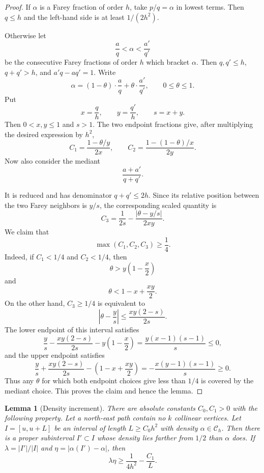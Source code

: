 \documentclass[11pt]{article}
\newtheorem{lemma}[theorem]{Lemma}
\theoremstyle{definition}
\theoremstyle{remark}
\newcommand{\1}{\mathbf 1}
\begin{document}
\begin{proof}
If $\alpha$ is a Farey fraction of order $h$, take $p/q=\alpha$ in lowest terms. Then $q\le h$ and the left-hand side is at least $1/(2h^2)$.

\bigskip
\noindent
Otherwise let
\[
\frac aq<\alpha<\frac{a'}{q'}
\]
be the consecutive Farey fractions of order $h$ which bracket $\alpha$. Then $q,q'\le h$, $q+q'>h$, and $a'q-aq'=1$. Write
\[
\alpha=(1-\theta)\cdot\frac aq+\theta\cdot\frac{a'}{q'},
\qquad 0\le\theta\le1.
\]
Put
\[
x=\frac qh,
\qquad
 y=\frac{q'}h,
\qquad s=x+y.
\]
Then $0<x,y\le1$ and $s>1$. The two endpoint fractions give, after multiplying the desired expression by $h^2$,
\[
C_1=\frac{1-\theta/y}{2x},
\qquad
C_2=\frac{1-(1-\theta)/x}{2y}.
\]
Now also consider the mediant
\[
\frac{a+a'}{q+q'}.
\]

\smallskip
\noindent
It is reduced and has denominator $q+q'\le2h$. Since its relative position between the two Farey neighbors is $y/s$, the corresponding scaled quantity is
\[
C_3=\frac1{2s}-\frac{|\theta-y/s|}{2xy}.
\]
We claim that
\[
\max(C_1,C_2,C_3)\ge\frac14.
\]
Indeed, if $C_1<1/4$ and $C_2<1/4$, then
\[
\theta>y\left(1-\frac x2\right)
\]
and
\[
\theta<1-x+\frac{xy}{2}.
\]
On the other hand, $C_3\ge1/4$ is equivalent to
\[
\left|\theta-\frac ys\right|\le \frac{xy(2-s)}{2s}.
\]
The lower endpoint of this interval satisfies
\[
\frac ys-\frac{xy(2-s)}{2s}-y\left(1-\frac x2\right)
=\frac{y(x-1)(s-1)}{s}\le0,
\]
and the upper endpoint satisfies
\[
\frac ys+\frac{xy(2-s)}{2s}-\left(1-x+\frac{xy}{2}\right)
=-\frac{x(y-1)(s-1)}{s}\ge0.
\]
Thus any $\theta$ for which both endpoint choices give less than $1/4$ is covered by the mediant choice. This proves the claim and hence the lemma.
\end{proof}

\begin{lemma}[Density increment]\label{lem:density_increment}
There are absolute constants $C_0,C_1>0$ with the following property. Let a north-east path contain no $k$ collinear vertices. Let $I=[u,u+L]$ be an interval of length $L\ge C_0h^2$ with density $\alpha\in\mathcal C_h$. Then there is a proper subinterval $I'\subset I$ whose density lies farther from $1/2$ than $\alpha$ does. If $\lambda=|I'|/|I|$ and $\eta=|\alpha(I')-\alpha|$, then
\[
\lambda\eta\ge \frac1{4h^2}-\frac{C_1}{L}.
\]
\end{lemma}
\end{document}
